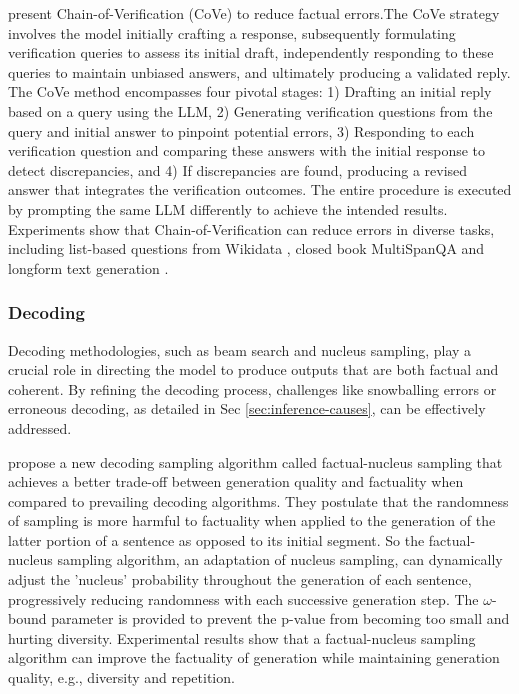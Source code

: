 \citet{dhuliawala2023chain} present Chain-of-Verification (CoVe) to reduce factual errors.The CoVe strategy involves the model initially crafting a response, subsequently formulating verification queries to assess its initial draft, independently responding to these queries to maintain unbiased answers, and ultimately producing a validated reply. The CoVe method encompasses four pivotal stages: 1) Drafting an initial reply based on a query using the LLM, 2) Generating verification questions from the query and initial answer to pinpoint potential errors, 3) Responding to each verification question and comparing these answers with the initial response to detect discrepancies, and 4) If discrepancies are found, producing a revised answer that integrates the verification outcomes. The entire procedure is executed by prompting the same LLM differently to achieve the intended results. Experiments show that Chain-of-Verification can reduce errors in diverse tasks, including list-based questions from Wikidata \citep{wikidata}, closed book MultiSpanQA \citep{multispanqa} and longform text generation \citep{Min2023-FActScore}.


\subsubsection{Decoding}
\label{sec:enhace_pure_decoding}

Decoding methodologies, such as beam search and nucleus sampling, play a crucial role in directing the model to produce outputs that are both factual and coherent. By refining the decoding process, challenges like snowballing errors or erroneous decoding, as detailed in Sec \ref{sec:inference-causes}, can be effectively addressed.

\citet{lee2022factuality} propose a new decoding sampling algorithm called factual-nucleus sampling that achieves a better trade-off between generation quality and factuality when compared to prevailing decoding algorithms. They postulate that the randomness of sampling is more harmful to factuality when applied to the generation of the latter portion of a sentence as opposed to its initial segment. So the factual-nucleus sampling algorithm, an adaptation of nucleus sampling, can dynamically adjust the 'nucleus' probability throughout the generation of each sentence, progressively reducing randomness with each successive generation step. The $\omega$-bound parameter is provided to prevent the p-value from becoming too small and hurting diversity. Experimental results show that a factual-nucleus sampling algorithm can improve the factuality of generation while maintaining generation quality, e.g.,  diversity and repetition.

